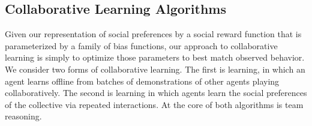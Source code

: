 
\subsection{Collaborative Learning Algorithms}
\label{sec:learning}

Given our representation of social preferences by a social reward
function that is parameterized by a family of bias functions, our
approach to collaborative learning is simply to optimize those
parameters to best match observed behavior.  We consider two forms of
collaborative learning.  The first is  learning, in which
an agent learns offline from batches of demonstrations of other agents
playing collaboratively.  The second is  learning
in which agents learn the social preferences of the collective via
repeated interactions.
%
At the core of both algorithms is team reasoning.



